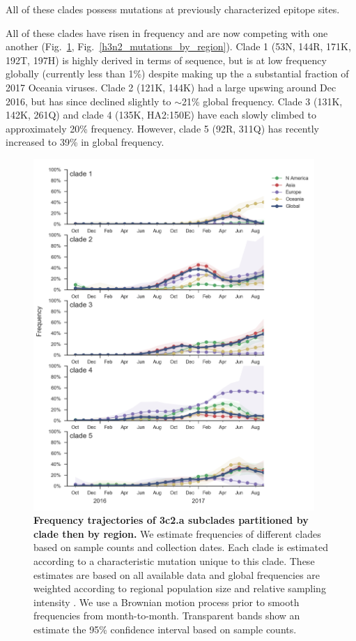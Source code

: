 \documentclass[11pt,oneside,letterpaper]{article}
\newcommand{\FIG}[1]{Fig.~\ref{#1}}
\begin{document}
All of these clades possess mutations at previously characterized
epitope sites.

All of these clades have risen in frequency and are now competing with
one another (\FIG{h3n2_mutations}, \FIG{h3n2_mutations_by_region}). Clade 1 (53N, 144R, 171K, 192T, 197H) is highly derived in
terms of sequence, but is at low frequency globally (currently less than
1\%) despite making up the a substantial fraction of 2017 Oceania
viruses. Clade 2 (121K, 144K) had a large upswing around Dec 2016, but has since declined slightly to $\sim$21\% global frequency. Clade 3 (131K, 142K,
261Q) and clade 4 (135K, HA2:150E) have each slowly climbed to
approximately 20\% frequency. However, clade 5 (92R, 311Q) has recently
increased to 39\% in global frequency.

\begin{figure}[h!]
  \centering
  \includegraphics[width=0.95\textwidth]{../figures/sep-2017/h3n2_mutations.png}
  \caption{\textbf{Frequency trajectories of 3c2.a subclades partitioned by clade then by region.}
  We estimate frequencies of different clades based on sample counts and collection dates.
  Each clade is estimated according to a characteristic mutation unique to this clade.
  These estimates are based on all available data and global frequencies are weighted according to regional population size and relative sampling intensity .
  We use a Brownian motion process prior to smooth frequencies from month-to-month.
  Transparent bands show an estimate the 95\% confidence interval based on sample counts.
  }
  \label{h3n2_mutations}
\end{figure}
\end{document}
